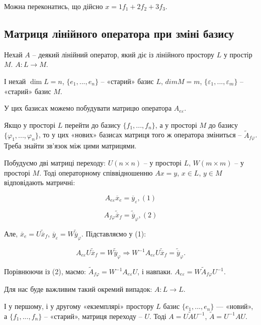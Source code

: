 Можна переконатись, що дійсно $x = 1 f_1 + 2 f_2 + 3 f_3$.


\subsection*{Матриця лінійного оператора при зміні базису}

Нехай $A$ -- деякий лінійний оператор, який діє із лінійного простору $L$ у
простір $M$. $A: L \rightarrow M$.

І нехай $\dim L = n$, $\{e_1, ..., e_n\}$ -- «старий» базис $L$, $dim M = m$,
$\{\varepsilon_1, ..., \varepsilon_m\}$ -- «старий» базис $M$.

У цих базисах можемо побудувати матрицю оператора $A_{e \varepsilon}$.

Якщо у просторі $L$ перейти до базису $\{f_1 ,..., f_n\}$, а у просторі $M$ до
базису $\{\varphi_1 ,..., \varphi_n\}$, то у цих «нових» базисах матриця того ж оператора
зміниться -- $\tilde{A}_{f \varphi}$. Треба знайти зв’язок між цими матрицями.

Побудуємо дві матриці переходу: $U(n \times n)$ -- у просторі $L$, $W (m \times m)$ -- у
просторі $M$. Тоді операторному співвідношенню $A x = y$, $x \in L$, $y \in M$
відповідають матричні:

$$A_{e \varepsilon} \overline{x}_{e} = \overline{y}_{\varepsilon}, (1)$$

$$A_{f \varphi} \tilde{\overline{x}}_{f} = \tilde{\overline{y}}_{\varphi}, (2)$$

Але, $\overline{x}_{e} = U \tilde{\overline{x}}_f$,
$\overline{y}_{\varepsilon} = W \tilde{\overline{y}}_{\varphi}$. Підставляємо у (1):

$$A_{e \varepsilon} U \tilde{\overline{x}}_f = W \tilde{\overline{y}}_{\varphi} 
\Rightarrow W^{-1} A_{e \varepsilon} U \tilde{\overline{x}}_f = \tilde{\overline{y}}_{\varphi}.$$

Порівнюючи із (2), маємо: $\tilde{A}_{f \varphi} = W^{-1} A_{e \varepsilon} U$,
і навпаки. $A_{e \varepsilon} = W \tilde{A}_{f \varphi} U^{-1}$.

Для нас буде важливим такий окремий випадок: $A: L \rightarrow L$.

І у першому, і у другому «екземплярі» простору $L$ базис $\{e_1 ,..., e_n\}$ ---
«новий», а $\{f_1 ,..., f_n\}$ -- «старий», матриця переходу -- $U$.
Тоді $A = U \tilde{A} U^{-1}$, $\tilde{A} = U^{-1} A U$.

